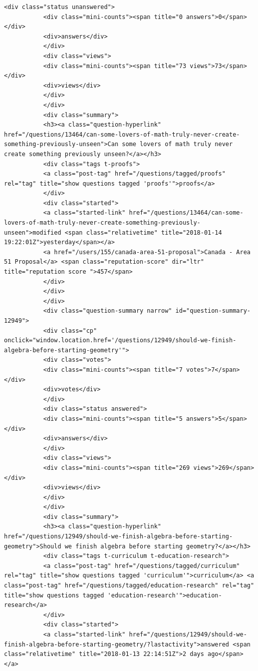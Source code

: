 \documentclass[11pt]{article}
\begin{document}
\begin{Verbatim}[commandchars=\\\{\}]
           <div class="status unanswered">
           <div class="mini-counts"><span title="0 answers">0</span></div>
           <div>answers</div>
           </div>
           <div class="views">
           <div class="mini-counts"><span title="73 views">73</span></div>
           <div>views</div>
           </div>
           </div>
           <div class="summary">
           <h3><a class="question-hyperlink" href="/questions/13464/can-some-lovers-of-math-truly-never-create-something-previously-unseen">Can some lovers of math truly never create something previously unseen?</a></h3>
           <div class="tags t-proofs">
           <a class="post-tag" href="/questions/tagged/proofs" rel="tag" title="show questions tagged 'proofs'">proofs</a>
           </div>
           <div class="started">
           <a class="started-link" href="/questions/13464/can-some-lovers-of-math-truly-never-create-something-previously-unseen">modified <span class="relativetime" title="2018-01-14 19:22:01Z">yesterday</span></a>
           <a href="/users/155/canada-area-51-proposal">Canada - Area 51 Proposal</a> <span class="reputation-score" dir="ltr" title="reputation score ">457</span>
           </div>
           </div>
           </div>
           <div class="question-summary narrow" id="question-summary-12949">
           <div class="cp" onclick="window.location.href='/questions/12949/should-we-finish-algebra-before-starting-geometry'">
           <div class="votes">
           <div class="mini-counts"><span title="7 votes">7</span></div>
           <div>votes</div>
           </div>
           <div class="status answered">
           <div class="mini-counts"><span title="5 answers">5</span></div>
           <div>answers</div>
           </div>
           <div class="views">
           <div class="mini-counts"><span title="269 views">269</span></div>
           <div>views</div>
           </div>
           </div>
           <div class="summary">
           <h3><a class="question-hyperlink" href="/questions/12949/should-we-finish-algebra-before-starting-geometry">Should we finish algebra before starting geometry?</a></h3>
           <div class="tags t-curriculum t-education-research">
           <a class="post-tag" href="/questions/tagged/curriculum" rel="tag" title="show questions tagged 'curriculum'">curriculum</a> <a class="post-tag" href="/questions/tagged/education-research" rel="tag" title="show questions tagged 'education-research'">education-research</a>
           </div>
           <div class="started">
           <a class="started-link" href="/questions/12949/should-we-finish-algebra-before-starting-geometry/?lastactivity">answered <span class="relativetime" title="2018-01-13 22:14:51Z">2 days ago</span></a>

\end{Verbatim}
\end{document}
